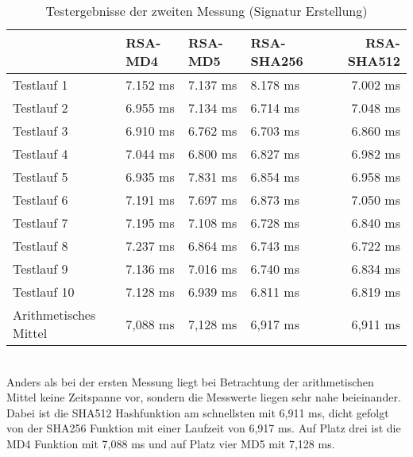 \begin{table}[h]
	\begin{tabularx}{\textwidth}{p{}|X|X|X|r}
		& RSA-MD4 & RSA-MD5 & RSA-SHA256 & RSA-SHA512\\
		\hline
		Testlauf 1& 7.152 ms& 7.137 ms& 8.178 ms& 7.002 ms\\
		Testlauf 2& 6.955 ms& 7.134 ms& 6.714 ms& 7.048 ms\\
		Testlauf 3& 6.910 ms& 6.762 ms& 6.703 ms& 6.860 ms\\
		Testlauf 4& 7.044 ms& 6.800 ms& 6.827 ms& 6.982 ms\\
		Testlauf 5& 6.935 ms& 7.831 ms& 6.854 ms& 6.958 ms\\
		Testlauf 6& 7.191 ms& 7.697 ms& 6.873 ms& 7.050 ms\\
		Testlauf 7& 7.195 ms& 7.108 ms& 6.728 ms& 6.840 ms\\
		Testlauf 8& 7.237 ms& 6.864 ms& 6.743 ms& 6.722 ms\\
		Testlauf 9& 7.136 ms& 7.016 ms& 6.740 ms& 6.834 ms\\
		Testlauf 10& 7.128 ms& 6.939 ms& 6.811 ms& 6.819 ms\\
		\hline
		Arithmetisches Mittel& 7,088 ms& 7,128 ms& 6,917 ms& 6,911 ms\\
	\end{tabularx}
	\caption{Testergebnisse der zweiten Messung (Signatur Erstellung)}
\end{table}\\
Anders als bei der ersten Messung liegt bei Betrachtung der arithmetischen Mittel keine Zeitspanne vor, sondern die Messwerte liegen sehr nahe beieinander. Dabei ist die SHA512 Hashfunktion am schnellsten mit 6,911 ms, dicht gefolgt von der SHA256 Funktion mit einer Laufzeit von 6,917 ms. Auf Platz drei ist die MD4 Funktion mit 7,088 ms und auf Platz vier MD5 mit 7,128 ms.\\
